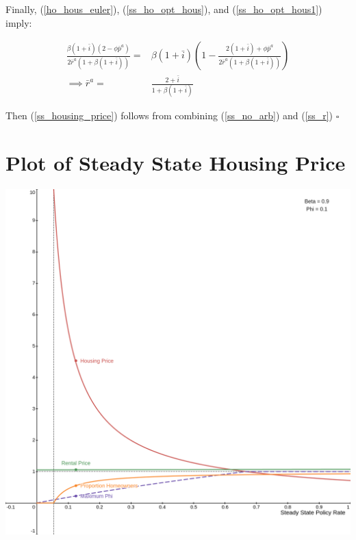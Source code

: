\documentclass{article}
\begin{document}
\begin{appendix}
Finally, (\ref{ho_hous_euler}), (\ref{ss_ho_opt_hous}), and (\ref{ss_ho_opt_hous1}) imply:

\begin{align}
    \frac{\beta(1+\bar{i})(2-\phi\bar{p}^a)}{2\bar{r}^a(1+\beta(1+\bar{i}))} =& \beta (1+\bar{i}) \left(1 - \frac{2(1+\bar{i})+\phi \bar{p}^a}{2\bar{r}^a(1+\beta(1+\bar{i}))}\right) \nonumber \\
    \implies \bar{r}^a =& \frac{2+\bar{i}}{1+\beta(1+\bar{i})} \label{ss_r}
\end{align}

Then (\ref{ss_housing_price}) follows from combining (\ref{ss_no_arb}) and (\ref{ss_r}) $\square$

\section{Plot of Steady State Housing Price}

\includegraphics[width=\linewidth]{asset_price_rental_rate.png}

\end{appendix}
\end{document}

